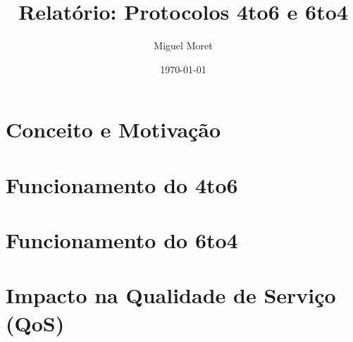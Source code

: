 \documentclass{article}
\title{Relatório: Protocolos 4to6 e 6to4}
\author{Miguel Moret}
\date{\today}
\begin{document}
\maketitle

\section{Conceito e Motivação}

\section{Funcionamento do 4to6}

\section{Funcionamento do 6to4}

\section{Impacto na Qualidade de Serviço (QoS)}
\end{document}
